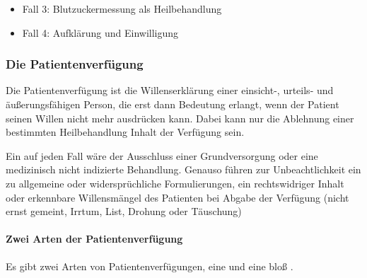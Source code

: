 {
\begin{itemize}
  \item Fall 3: Blutzuckermessung als Heilbehandlung
  \dotfill{}
  \item Fall 4: Aufklärung und Einwilligung
  \dotfill{}
\end{itemize}
}
{}
{}
{}
{}

\subsubsection{Die Patientenverfügung}


Die Patientenverfügung ist die Willenserklärung einer
einsicht-, urteils- und äußerungsfähigen Person, die
erst dann Bedeutung erlangt, wenn der Patient seinen Willen
nicht mehr ausdrücken kann.
Dabei kann nur die Ablehnung einer bestimmten
Heilbehandlung Inhalt der Verfügung sein.

Ein auf jeden Fall  wäre der
Ausschluss einer Grundversorgung oder eine medizinisch
nicht indizierte Behandlung. Genauso führen zur
Unbeachtlichkeit ein zu
allgemeine oder widersprüchliche Formulierungen, ein
rechtswidriger Inhalt oder erkennbare Willensmängel des
Patienten bei Abgabe der Verfügung (nicht ernst gemeint,
Irrtum, List, Drohung oder Täuschung)

\paragraph{Zwei Arten der Patientenverfügung}

Es gibt zwei Arten von Patientenverfügungen, eine
 und eine
bloß . 


